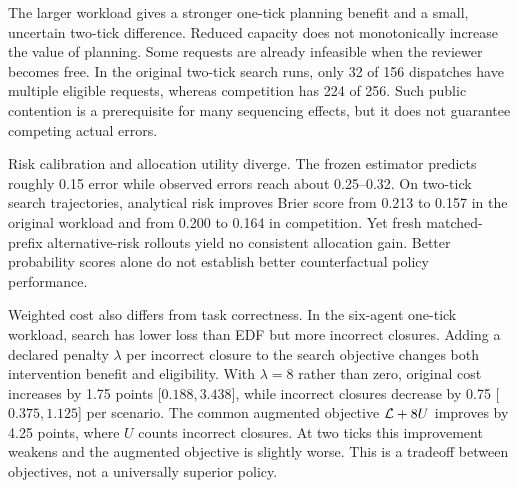 The larger workload gives a stronger one-tick planning benefit and a small, uncertain two-tick difference. Reduced capacity does not monotonically increase the value of planning. Some requests are already infeasible when the reviewer becomes free. In the original two-tick search runs, only 32 of 156 dispatches have multiple eligible requests, whereas competition has 224 of 256. Such public contention is a prerequisite for many sequencing effects, but it does not guarantee competing actual errors.

Risk calibration and allocation utility diverge. The frozen estimator predicts roughly 0.15 error while observed errors reach about 0.25--0.32. On two-tick search trajectories, analytical risk improves Brier score from 0.213 to 0.157 in the original workload and from 0.200 to 0.164 in competition. Yet fresh matched-prefix alternative-risk rollouts yield no consistent allocation gain. Better probability scores alone do not establish better counterfactual policy performance.

Weighted cost also differs from task correctness. In the six-agent one-tick workload, search has lower loss than EDF but more incorrect closures. Adding a declared penalty $\lambda$ per incorrect closure to the search objective changes both intervention benefit and eligibility. With $\lambda=8$ rather than zero, original cost increases by 1.75 points [$0.188,3.438$], while incorrect closures decrease by 0.75 [$0.375,1.125$] per scenario. The common augmented objective $\mathcal{L}+8U$ improves by 4.25 points, where $U$ counts incorrect closures. At two ticks this improvement weakens and the augmented objective is slightly worse. This is a tradeoff between objectives, not a universally superior policy.


